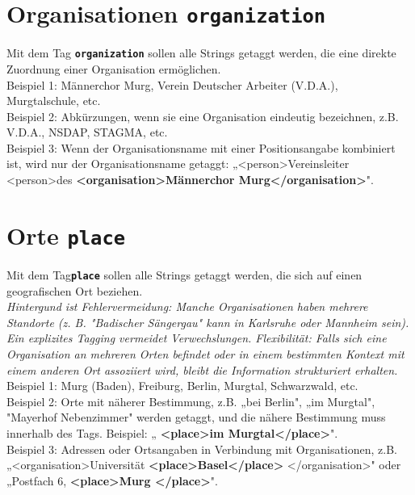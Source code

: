 \documentclass{article}
\begin{document}
\section*{Organisationen \texttt{\texttt{\textbf{{\colorbox{organization}{organization}}}}}}


Mit dem Tag \texttt{\texttt{\textbf{{\colorbox{organization}{organization}}}}} sollen alle Strings getaggt werden, die eine direkte Zuordnung einer Organisation ermöglichen. \\

\noindent{} Beispiel 1: Männerchor Murg, Verein Deutscher Arbeiter (V.D.A.), Murgtalschule, etc.\\
 Beispiel 2: Abkürzungen, wenn sie eine Organisation eindeutig bezeichnen, z.B. V.D.A., NSDAP, STAGMA, etc.\\
 Beispiel 3: Wenn der Organisationsname mit einer Positionsangabe kombiniert ist, wird nur der Organisationsname getaggt: „\textless person\textgreater Vereinsleiter \textless person\textgreater des \textbf{\textless organisation\textgreater Männerchor Murg\textless /organisation\textgreater}". \\

\section*{Orte \texttt{\texttt{\textbf{{\colorbox{place}{place}}}}}}


Mit dem Tag\texttt{\texttt{\textbf{{\colorbox{place}{place}}}}} sollen alle Strings getaggt werden, die sich auf einen geografischen Ort beziehen. \\
\indent\textit{Hintergund ist Fehlervermeidung: Manche Organisationen haben mehrere Standorte (z. B. "Badischer Sängergau" kann in Karlsruhe oder Mannheim sein). Ein explizites Tagging vermeidet Verwechslungen.
Flexibilität: Falls sich eine Organisation an mehreren Orten befindet oder in einem bestimmten Kontext mit einem anderen Ort assoziiert wird, bleibt die Information strukturiert erhalten.} \\

\noindent{} Beispiel 1: Murg (Baden), Freiburg, Berlin, Murgtal, Schwarzwald, etc.\\
 Beispiel 2: Orte mit näherer Bestimmung, z.B. „bei Berlin", „im Murgtal", "Mayerhof Nebenzimmer" werden getaggt, und die nähere Bestimmung muss innerhalb des Tags. Beispiel: „ \textbf{\textless place\textgreater  im Murgtal\textless /place\textgreater }".\\
 Beispiel 3: Adressen oder Ortsangaben in Verbindung mit Organisationen, z.B. „\textless organisation\textgreater Universität \textbf{\textless place\textgreater  Basel\textless /place\textgreater} \textless /organisation\textgreater" oder „Postfach 6, \textbf{\textless place\textgreater  Murg \textless /place\textgreater }". \\
\end{document}
